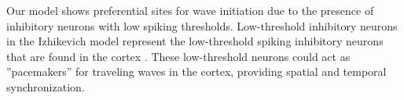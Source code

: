 \documentclass[a4paper,11pt]{article}
\begin{document}
Our model shows preferential sites for wave initiation due to the presence of inhibitory neurons with low spiking thresholds.
Low-threshold inhibitory neurons in the Izhikevich model represent the low-threshold spiking inhibitory neurons that are found in the cortex \cite{izhikevich2003}\cite{gibson2009}.
These low-threshold neurons could act as ''pacemakers'' for traveling waves in the cortex, providing spatial and temporal synchronization.

\clearpage
\printbibliography
\end{document}
